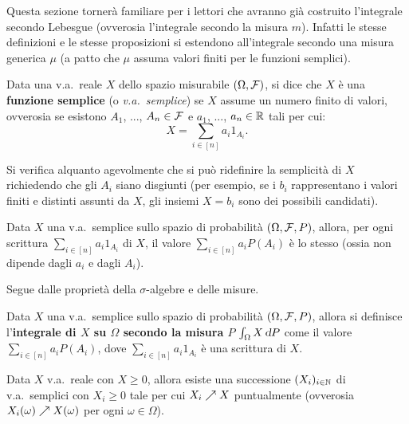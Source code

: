 \begin{multicols*}{2}
Questa sezione tornerà familiare per i lettori che avranno già costruito
l'integrale secondo Lebesgue (ovverosia l'integrale secondo la misura
$m$). Infatti le stesse definizioni e le stesse proposizioni si
estendono all'integrale secondo una misura generica $\mu$ (a patto
che $\mu$ assuma valori finiti per le funzioni semplici).

\begin{definition}
    Data una v.a.~reale $X$ dello spazio misurabile
    $(\Omega, \mathcal{F})$, si dice che $X$ è una
    \textbf{funzione semplice} (o \textit{v.a.~semplice}) se $X$ assume un numero
    finito di valori, ovverosia se esistono $A_1$, ...,
    $A_n \in \mathcal{F}$ e $a_1$, ..., $a_n \in \mathbb{R}$ tali
    per cui:
    \[
        X = \sum_{i \in [n]} a_i 1_{A_i}.
    \] 
\end{definition}

\begin{remark}
    Si verifica alquanto agevolmente che si può ridefinire la
    semplicità di $X$ richiedendo che gli $A_i$ siano
    disgiunti (per esempio, se i $b_i$ rappresentano i valori finiti
    e distinti assunti da $X$, gli insiemi $X = b_i$ sono dei possibili
    candidati).
\end{remark}

\begin{proposition}
    Data $X$ una v.a.~semplice sullo spazio di probabilità
    $(\Omega, \mathcal{F}, P)$, allora, per ogni scrittura $\sum_{i \in [n]} a_i 1_{A_i}$ di $X$,
    il valore $\sum_{i \in [n]} a_i P(A_i)$ è lo stesso (ossia non dipende dagli
    $a_i$ e dagli $A_i$). \smallskip


    Segue dalle proprietà della $\sigma$-algebre e delle misure.
\end{proposition}

\begin{definition}
    Data $X$ una v.a.~semplice sullo spazio di probabilità
    $(\Omega, \mathcal{F}, P)$, allora si definisce l'\textbf{integrale di $X$ su
    $\Omega$ secondo la misura $P$}
    $\int_\Omega X \dP$ come il valore $\sum_{i \in [n]} a_i P(A_i)$, dove
    $\sum_{i \in [n]} a_i 1_{A_i}$ è una scrittura di $X$.
\end{definition}

\begin{lemma}
    Data $X$ v.a.~reale con $X \geq 0$, allora esiste una successione $(X_i)_{i \in \mathbb{N}}$ di
    v.a.~semplici con $X_i \geq 0$ tale per cui $X_i \nearrow X$ puntualmente (ovverosia
    $X_i(\omega) \nearrow X(\omega)$ per ogni $\omega \in \Omega$).
\end{lemma}


\end{multicols*}
